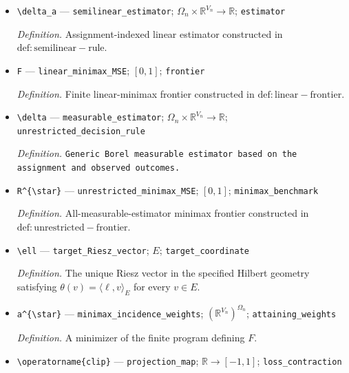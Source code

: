 \documentclass{article}
\begin{document}
\begin{itemize}
  \par\smallskip\noindent\emph{Definition.} Collection \(a=(a_z)_{z\in\Omega_n}\).
  \item \texttt{\textbackslash{}\allowbreak{}delta\_\allowbreak{}a} --- \texttt{semilinear\_\allowbreak{}estimator}; \(\Omega_n\times\mathbb R^{V_n}\to\mathbb R\); \texttt{estimator}
  \par\smallskip\noindent\emph{Definition.} Assignment-indexed linear estimator constructed in \(\mathrm{def:semilinear-rule}\).
  \item \texttt{F} --- \texttt{linear\_\allowbreak{}minimax\_\allowbreak{}MSE}; \([0,1]\); \texttt{frontier}
  \par\smallskip\noindent\emph{Definition.} Finite linear-minimax frontier constructed in \(\mathrm{def:linear-frontier}\).
  \item \texttt{\textbackslash{}\allowbreak{}delta} --- \texttt{measurable\_\allowbreak{}estimator}; \(\Omega_n\times\mathbb R^{V_n}\to\mathbb R\); \texttt{unrestricted\_\allowbreak{}decision\_\allowbreak{}rule}
  \par\smallskip\noindent\emph{Definition.} \texttt{Generic Borel measurable estimator based on the assignment and observed outcomes.}
  \item \texttt{R\textasciicircum{}\{\textbackslash{}\allowbreak{}star\}\allowbreak{}} --- \texttt{unrestricted\_\allowbreak{}minimax\_\allowbreak{}MSE}; \([0,1]\); \texttt{minimax\_\allowbreak{}benchmark}
  \par\smallskip\noindent\emph{Definition.} All-measurable-estimator minimax frontier constructed in \(\mathrm{def:unrestricted-frontier}\).
  \item \texttt{\textbackslash{}\allowbreak{}ell} --- \texttt{target\_\allowbreak{}Riesz\_\allowbreak{}vector}; \(E\); \texttt{target\_\allowbreak{}coordinate}
  \par\smallskip\noindent\emph{Definition.} The unique Riesz vector in the specified Hilbert geometry satisfying \(\theta(v)=\langle\ell,v\rangle_E\) for every \(v\in E\).
  \item \texttt{a\textasciicircum{}\{\textbackslash{}\allowbreak{}star\}\allowbreak{}} --- \texttt{minimax\_\allowbreak{}incidence\_\allowbreak{}weights}; \((\mathbb R^{V_n})^{\Omega_n}\); \texttt{attaining\_\allowbreak{}weights}
  \par\smallskip\noindent\emph{Definition.} A minimizer of the finite program defining \(F\).
  \item \texttt{\textbackslash{}\allowbreak{}operatorname\{clip\}\allowbreak{}} --- \texttt{projection\_\allowbreak{}map}; \(\mathbb R\to[-1,1]\); \texttt{loss\_\allowbreak{}contraction}

\end{itemize}
\end{document}
